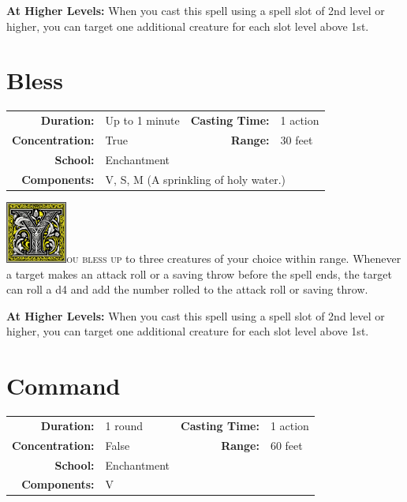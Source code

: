 \documentclass[12pt,showtrims]{memoir}
\begin{document}
\vspace{8pt} \noindent\textbf{At Higher Levels:} When you cast this spell using a spell slot of 2nd level or higher, you can target one additional creature for each slot level above 1st.
\newpage

\section*{Bless}

{
\small\centering\vspace{-6pt}
\begin{tabular}{rlrl}
\toprule

\textbf{Duration:} & Up to 1 minute &
\textbf{Casting Time:} & 1 action \\
\textbf{Concentration:} & True &
\textbf{Range:} & 30 feet \\
\textbf{School:} & Enchantment \\
\textbf{Components:} & \multicolumn{3}{p{0.7\textwidth}}{V, S, M (A sprinkling of holy water.)}\\

\bottomrule
\end{tabular}
}

\vspace{1\baselineskip}\noindent
\lettrine[lines=4]{\includegraphics[height=58pt]{initials/Y.png}}{ou bless up} to three creatures of your choice within range. Whenever a target makes an attack roll or a saving throw before the spell ends, the target can roll a d4 and add the number rolled to the attack roll or saving throw.

\vspace{8pt} \noindent\textbf{At Higher Levels:} When you cast this spell using a spell slot of 2nd level or higher, you can target one additional creature for each slot level above 1st.
\newpage
\section*{Command}

{
\small\centering\vspace{-6pt}
\begin{tabular}{rlrl}
\toprule

\textbf{Duration:} & 1 round &
\textbf{Casting Time:} & 1 action \\
\textbf{Concentration:} & False &
\textbf{Range:} & 60 feet \\
\textbf{School:} & Enchantment \\
\textbf{Components:} & \multicolumn{3}{p{0.7\textwidth}}{V}\\

\bottomrule
\end{tabular}
}
\end{document}
